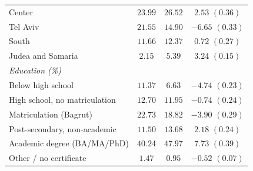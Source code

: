 \begin{tabular}{lccc}
\quad Center & $23.99$ & $26.52$ & $2.53$ $(0.36)$ \\
\quad Tel Aviv & $21.55$ & $14.90$ & $-6.65$ $(0.33)$ \\
\quad South & $11.66$ & $12.37$ & $0.72$ $(0.27)$ \\
\quad Judea and Samaria & $2.15$ & $5.39$ & $3.24$ $(0.15)$ \\
\addlinespace
\emph{Education (\%)} &  &  &  \\
\quad Below high school & $11.37$ & $6.63$ & $-4.74$ $(0.23)$ \\
\quad High school, no matriculation & $12.70$ & $11.95$ & $-0.74$ $(0.24)$ \\
\quad Matriculation (Bagrut) & $22.73$ & $18.82$ & $-3.90$ $(0.29)$ \\
\quad Post-secondary, non-academic & $11.50$ & $13.68$ & $2.18$ $(0.24)$ \\
\quad Academic degree (BA/MA/PhD) & $40.24$ & $47.97$ & $7.73$ $(0.39)$ \\
\quad Other / no certificate & $1.47$ & $0.95$ & $-0.52$ $(0.07)$ \\
\bottomrule
\end{tabular}
